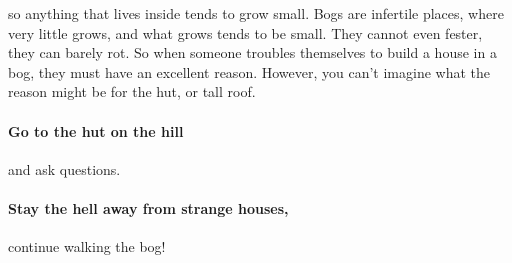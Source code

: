 so anything that lives inside tends to grow small.
Bogs are infertile places, where very little grows, and what grows tends to be small.
They cannot even fester, they can barely rot.
So when someone troubles themselves to build a house in a bog, they must have an excellent reason.
However, you can't imagine what the reason might be for the hut, or tall roof.

\paragraph{Go to the hut on the hill}
and ask questions.

\paragraph{Stay the hell away from strange houses,}
continue walking the bog!

